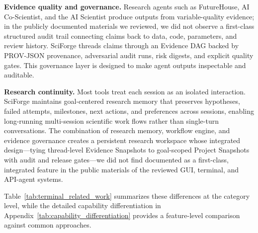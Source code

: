 \documentclass[sn-basic,Numbered,pdflatex]{sn-jnl}
\begin{document}
\textbf{Evidence quality and governance.} Research agents such as FutureHouse, AI Co-Scientist, and the AI Scientist produce outputs from variable-quality evidence; in the publicly documented materials we reviewed, we did not observe a first-class structured audit trail connecting claims back to data, code, parameters, and review history. SciForge threads claims through an Evidence DAG backed by PROV-JSON provenance, adversarial audit runs, risk digests, and explicit quality gates. This governance layer is designed to make agent outputs inspectable and auditable.

\textbf{Research continuity.} Most tools treat each session as an isolated interaction. SciForge maintains goal-centered research memory that preserves hypotheses, failed attempts, milestones, next actions, and preferences across sessions, enabling long-running multi-session scientific work flows rather than single-turn conversations. The combination of research memory, workflow engine, and evidence governance creates a persistent research workspace whose integrated design---tying thread-level Evidence Snapshots to goal-scoped Project Snapshots with audit and release gates---we did not find documented as a first-class, integrated feature in the public materials of the reviewed GUI, terminal, and API-agent systems.

Table~\ref{tab:terminal_related_work} summarizes these differences at the category level, while the detailed capability differentiation in Appendix~\ref{tab:capability_differentiation} provides a feature-level comparison against common approaches.
\end{document}
